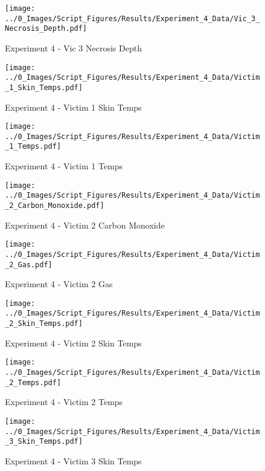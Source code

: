 	\clearpage

	\begin{figure}[H]
		\centering
		\texttt{[image: ../0\_Images/Script\_Figures/Results/Experiment\_4\_Data/Vic\_3\_Necrosis\_Depth.pdf]}
		\caption[]{Experiment 4 - Vic 3 Necrosis Depth}
	\end{figure}
 

	\begin{figure}[H]
		\centering
		\texttt{[image: ../0\_Images/Script\_Figures/Results/Experiment\_4\_Data/Victim\_1\_Skin\_Temps.pdf]}
		\caption[]{Experiment 4 - Victim 1 Skin Temps}
	\end{figure}
 
	\clearpage

	\begin{figure}[H]
		\centering
		\texttt{[image: ../0\_Images/Script\_Figures/Results/Experiment\_4\_Data/Victim\_1\_Temps.pdf]}
		\caption[]{Experiment 4 - Victim 1 Temps}
	\end{figure}
 

	\begin{figure}[H]
		\centering
		\texttt{[image: ../0\_Images/Script\_Figures/Results/Experiment\_4\_Data/Victim\_2\_Carbon\_Monoxide.pdf]}
		\caption[]{Experiment 4 - Victim 2 Carbon Monoxide}
	\end{figure}
 
	\clearpage

	\begin{figure}[H]
		\centering
		\texttt{[image: ../0\_Images/Script\_Figures/Results/Experiment\_4\_Data/Victim\_2\_Gas.pdf]}
		\caption[]{Experiment 4 - Victim 2 Gas}
	\end{figure}
 

	\begin{figure}[H]
		\centering
		\texttt{[image: ../0\_Images/Script\_Figures/Results/Experiment\_4\_Data/Victim\_2\_Skin\_Temps.pdf]}
		\caption[]{Experiment 4 - Victim 2 Skin Temps}
	\end{figure}
 
	\clearpage

	\begin{figure}[H]
		\centering
		\texttt{[image: ../0\_Images/Script\_Figures/Results/Experiment\_4\_Data/Victim\_2\_Temps.pdf]}
		\caption[]{Experiment 4 - Victim 2 Temps}
	\end{figure}
 

	\begin{figure}[H]
		\centering
		\texttt{[image: ../0\_Images/Script\_Figures/Results/Experiment\_4\_Data/Victim\_3\_Skin\_Temps.pdf]}
		\caption[]{Experiment 4 - Victim 3 Skin Temps}
	\end{figure}
 
